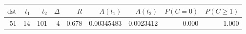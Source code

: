 \begin{tabular}{r r r r r r r r r}
\toprule
$\mathrm{dst}$ & $t_1$ & $t_2$ & $\Delta$ & $R$ & $A(t_1)$ & $A(t_2)$ & $P(C=0)$ & $P(C\ge1)$ \\
\midrule
51 & 14 & 101 & 4 & 0.678 & 0.00345483 & 0.0023412 & 0.000 & 1.000 \\
\bottomrule
\end{tabular}
